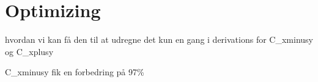 \chapter{Optimizing}


hvordan vi kan få den til at udregne det kun en gang i derivations for C\_xminusy og C\_xplusy

C\_xminusy fik en forbedring på 97\%
